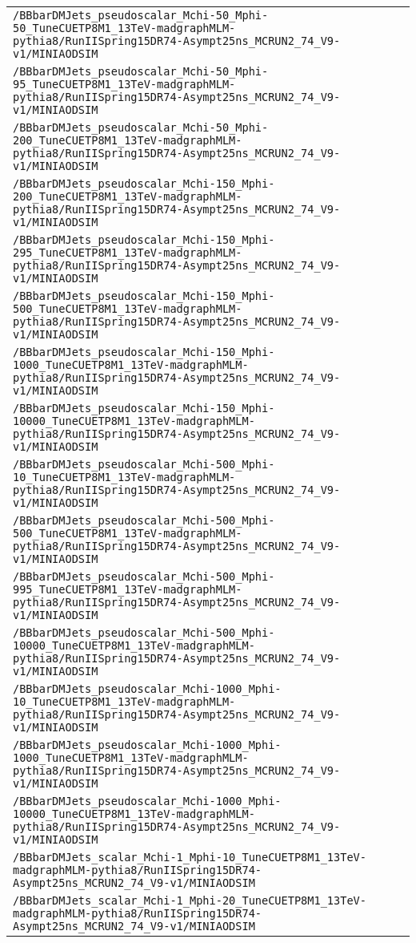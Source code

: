 \begin{center}
\begin{tabular}{l}
\verb!/BBbarDMJets_pseudoscalar_Mchi-50_Mphi-50_TuneCUETP8M1_13TeV-madgraphMLM-pythia8/RunIISpring15DR74-Asympt25ns_MCRUN2_74_V9-v1/MINIAODSIM! \tabularnewline
\verb!/BBbarDMJets_pseudoscalar_Mchi-50_Mphi-95_TuneCUETP8M1_13TeV-madgraphMLM-pythia8/RunIISpring15DR74-Asympt25ns_MCRUN2_74_V9-v1/MINIAODSIM! \tabularnewline
\verb!/BBbarDMJets_pseudoscalar_Mchi-50_Mphi-200_TuneCUETP8M1_13TeV-madgraphMLM-pythia8/RunIISpring15DR74-Asympt25ns_MCRUN2_74_V9-v1/MINIAODSIM! \tabularnewline
\verb!/BBbarDMJets_pseudoscalar_Mchi-150_Mphi-200_TuneCUETP8M1_13TeV-madgraphMLM-pythia8/RunIISpring15DR74-Asympt25ns_MCRUN2_74_V9-v1/MINIAODSIM! \tabularnewline
\verb!/BBbarDMJets_pseudoscalar_Mchi-150_Mphi-295_TuneCUETP8M1_13TeV-madgraphMLM-pythia8/RunIISpring15DR74-Asympt25ns_MCRUN2_74_V9-v1/MINIAODSIM! \tabularnewline
\verb!/BBbarDMJets_pseudoscalar_Mchi-150_Mphi-500_TuneCUETP8M1_13TeV-madgraphMLM-pythia8/RunIISpring15DR74-Asympt25ns_MCRUN2_74_V9-v1/MINIAODSIM! \tabularnewline
\verb!/BBbarDMJets_pseudoscalar_Mchi-150_Mphi-1000_TuneCUETP8M1_13TeV-madgraphMLM-pythia8/RunIISpring15DR74-Asympt25ns_MCRUN2_74_V9-v1/MINIAODSIM! \tabularnewline
\verb!/BBbarDMJets_pseudoscalar_Mchi-150_Mphi-10000_TuneCUETP8M1_13TeV-madgraphMLM-pythia8/RunIISpring15DR74-Asympt25ns_MCRUN2_74_V9-v1/MINIAODSIM! \tabularnewline
\verb!/BBbarDMJets_pseudoscalar_Mchi-500_Mphi-10_TuneCUETP8M1_13TeV-madgraphMLM-pythia8/RunIISpring15DR74-Asympt25ns_MCRUN2_74_V9-v1/MINIAODSIM! \tabularnewline
\verb!/BBbarDMJets_pseudoscalar_Mchi-500_Mphi-500_TuneCUETP8M1_13TeV-madgraphMLM-pythia8/RunIISpring15DR74-Asympt25ns_MCRUN2_74_V9-v1/MINIAODSIM! \tabularnewline
\verb!/BBbarDMJets_pseudoscalar_Mchi-500_Mphi-995_TuneCUETP8M1_13TeV-madgraphMLM-pythia8/RunIISpring15DR74-Asympt25ns_MCRUN2_74_V9-v1/MINIAODSIM! \tabularnewline
\verb!/BBbarDMJets_pseudoscalar_Mchi-500_Mphi-10000_TuneCUETP8M1_13TeV-madgraphMLM-pythia8/RunIISpring15DR74-Asympt25ns_MCRUN2_74_V9-v1/MINIAODSIM! \tabularnewline
\verb!/BBbarDMJets_pseudoscalar_Mchi-1000_Mphi-10_TuneCUETP8M1_13TeV-madgraphMLM-pythia8/RunIISpring15DR74-Asympt25ns_MCRUN2_74_V9-v1/MINIAODSIM! \tabularnewline
\verb!/BBbarDMJets_pseudoscalar_Mchi-1000_Mphi-1000_TuneCUETP8M1_13TeV-madgraphMLM-pythia8/RunIISpring15DR74-Asympt25ns_MCRUN2_74_V9-v1/MINIAODSIM! \tabularnewline
\verb!/BBbarDMJets_pseudoscalar_Mchi-1000_Mphi-10000_TuneCUETP8M1_13TeV-madgraphMLM-pythia8/RunIISpring15DR74-Asympt25ns_MCRUN2_74_V9-v1/MINIAODSIM! \tabularnewline
\verb!/BBbarDMJets_scalar_Mchi-1_Mphi-10_TuneCUETP8M1_13TeV-madgraphMLM-pythia8/RunIISpring15DR74-Asympt25ns_MCRUN2_74_V9-v1/MINIAODSIM! \tabularnewline
\verb!/BBbarDMJets_scalar_Mchi-1_Mphi-20_TuneCUETP8M1_13TeV-madgraphMLM-pythia8/RunIISpring15DR74-Asympt25ns_MCRUN2_74_V9-v1/MINIAODSIM! \tabularnewline

\end{tabular}
\end{center}
